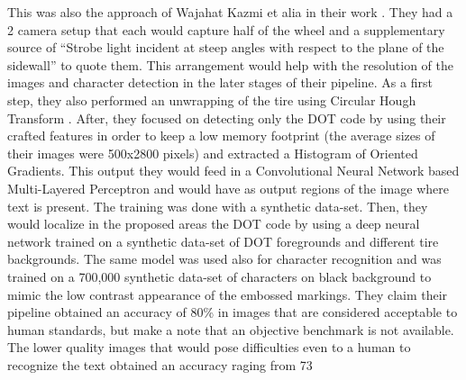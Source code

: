 This was also the approach of Wajahat Kazmi et alia in their work \cite{article:1}. They had a 2 camera setup that each would capture half of the wheel and a supplementary source of “Strobe light incident at steep angles with respect to the plane of the sidewall” to quote them. This arrangement would help with the resolution of the images and character detection in the later stages of their pipeline. As a first step, they also performed an unwrapping of the tire using Circular Hough Transform \cite{site:circular_hough_transform}. After, they focused on detecting only the DOT code by using their crafted features in order to keep a low memory footprint (the average sizes of their images were 500x2800 pixels) and extracted a Histogram of Oriented Gradients. This output they would feed in a Convolutional Neural Network based Multi-Layered Perceptron and would have as output regions of the image where text is present. The training was done with a synthetic data-set. Then, they would localize in the proposed areas the DOT code by using a deep neural network trained on a synthetic data-set of DOT foregrounds and different tire backgrounds. The same model was used also for character recognition and was trained on a 700,000 synthetic data-set of characters on black background to mimic the low contrast appearance of the embossed markings. They claim their pipeline obtained an accuracy of 80\% in images that are considered acceptable to human standards, but make a note that an objective benchmark is not available. The lower quality images that would pose difficulties even to a human to recognize the text obtained an accuracy raging from 73%

